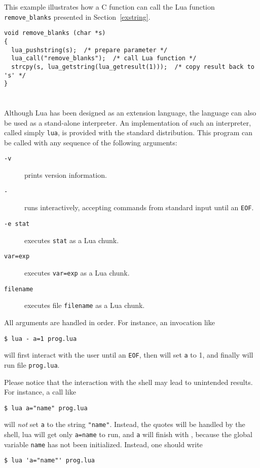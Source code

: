 This example illustrates how a C function can call the Lua function
\verb'remove_blanks' presented in Section~\ref{exstring}.
\begin{verbatim}
void remove_blanks (char *s)
{
  lua_pushstring(s);  /* prepare parameter */
  lua_call("remove_blanks");  /* call Lua function */
  strcpy(s, lua_getstring(lua_getresult(1)));  /* copy result back to 's' */
}
\end{verbatim}


\section{} \label{lua-sa}

Although Lua has been designed as an extension language,
the language can also be used as a stand-alone interpreter.
An implementation of such an interpreter,
called simply \verb|lua|,
is provided with the standard distribution.
This program can be called with any sequence of the following arguments:
\begin{description}
\item[{\tt -v}] prints version information.
\item[{\tt -}] runs interactively, accepting commands from standard input
until an \verb|EOF|.
\item[{\tt -e stat}] executes \verb|stat| as a Lua chunk.
\item[{\tt var=exp}] executes \verb|var=exp| as a Lua chunk.
\item[{\tt filename}] executes file \verb|filename| as a Lua chunk.
\end{description}
All arguments are handled in order.
For instance, an invocation like
\begin{verbatim}
$ lua - a=1 prog.lua
\end{verbatim}
will first interact with the user until an \verb|EOF|,
then will set \verb'a' to 1,
and finally will run file \verb'prog.lua'.

Please notice that the interaction with the shell may lead to
unintended results.
For instance, a call like
\begin{verbatim}
$ lua a="name" prog.lua
\end{verbatim}
will {\em not\/} set \verb|a| to the string \verb|"name"|.
Instead, the quotes will be handled by the shell,
lua will get only \verb'a=name' to run,
and \verb'a' will finish with \nil,
because the global variable \verb|name| has not been initialized.
Instead, one should write
\begin{verbatim}
$ lua 'a="name"' prog.lua
\end{verbatim}

